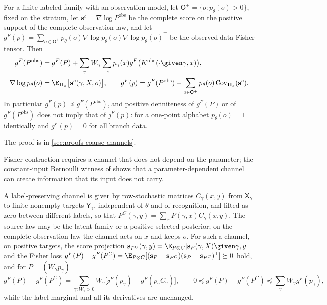 For a finite labeled family with an observation model, let $\mathsf O^+=\{o:p_\theta(o)>0\}$, fixed
on the stratum, let $\mathbf s^c=\nabla\log P^{\mathrm{obs}}$ be the complete score on the positive
support of the complete observation law, and let
$g^F(p)=\sum_{o\in\mathsf O^+}p_\theta(o)\nabla\log p_\theta(o)\nabla\log p_\theta(o)^\top$ be the
observed-data Fisher tensor. Then
\begin{align}
g^F(P^{\mathrm{obs}})
&=g^F(P)+\sum_\gamma W_\gamma\sum_xp_\gamma(x)g^F\bigl(K^{\mathrm{obs}}(\cdot\given\gamma,x)\bigr),
\label{eq:rg-thermo-finite-complete-observation-fisher}\\
\nabla\log p_\theta(o)
&=\E_{\boldsymbol\Pi_o}\bigl[\mathbf s^c(\gamma,X,o)\bigr],
\qquad
g^F(p)=g^F(P^{\mathrm{obs}})-\sum_{o\in\mathsf O^+}p_\theta(o)
\operatorname{Cov}_{\boldsymbol\Pi_o}(\mathbf s^c).
\label{eq:rg-thermo-finite-missing-information}
\end{align}
In particular $g^F(p)\preceq g^F(P^{\mathrm{obs}})$, and positive definiteness of $g^F(P)$ or of
$g^F(P^{\mathrm{obs}})$ does not imply that of $g^F(p)$: for a one-point alphabet $p_\theta(o)=1$
identically and $g^F(p)=0$ for all branch data. 

The proof is in \cref{sec:proofs-coarse-channels}.

Fisher contraction requires a channel that does not depend on the parameter; the constant-input
Bernoulli witness of  shows that a parameter-dependent
channel can create information that its input does not carry.

\label{def:rg-thermo-finite-channel}
\label{eq:rg-thermo-finite-channel}
\label{eq:rg-thermo-finite-score-projection}
\label{eq:rg-thermo-finite-fisher-loss}
A label-preserving channel is given by row-stochastic matrices $C_\gamma(x,y)$ from
$\mathsf X_\gamma$ to finite nonempty targets $\mathsf Y_\gamma$, independent of $\theta$ and of
recognition, and lifted as zero between different labels, so that
$P^C(\gamma,y)=\sum_xP(\gamma,x)C_\gamma(x,y)$. The source law may be the latent family or a
positive selected posterior; on the complete observation law the channel acts on $x$ and keeps $o$.
For such a channel, on positive targets, the score projection
$\mathbf s_{P^C}(\gamma,y)=\E_{P\otimes C}[\mathbf s_P(\gamma,X)\given\gamma,y]$ and the Fisher loss
$g^F(P)-g^F(P^C)=\E_{P\otimes C}[(\mathbf s_P-\mathbf s_{P^C})(\mathbf s_P-\mathbf s_{P^C})^\top]\succeq0$
hold, and for $P=(W_\gamma p_\gamma)$
\begin{equation}
g^F(P)-g^F(P^C)=\sum_{\gamma:W_\gamma>0}W_\gamma\bigl[g^F(p_\gamma)-g^F(p_\gamma C_\gamma)\bigr],
\qquad
0\preceq g^F(P)-g^F(P^C)\preceq\sum_\gamma W_\gamma g^F(p_\gamma),
\label{eq:rg-thermo-finite-within-loss}
\end{equation}
while the label marginal and all its derivatives are unchanged. 

